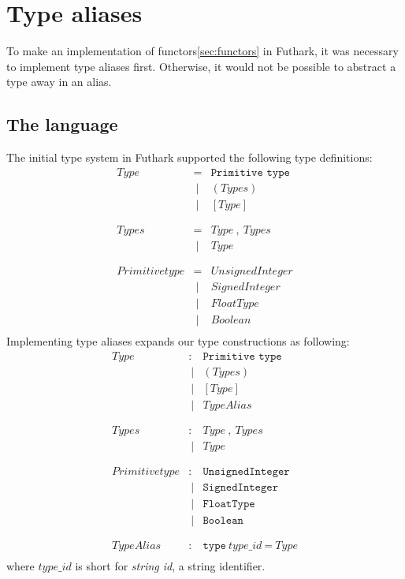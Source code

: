\section{Type aliases}
To make an implementation of functors\ref{sec:functors} in Futhark, it was necessary
to implement type aliases first. Otherwise, it would not be possible to abstract
a type away in an alias.
\subsection{The language}\label{futharks_types}
The initial type system in Futhark supported the following type definitions:
\begin{align*}
  Type           & = & \texttt{Primitive type} \\
                 &\ | & ( Types ) \\
                 &\ | & [ Type ] \\
  \\
  \\
  Types          & = & Type\ ,\ Types \\
                 &\ | & Type \\
  \\
  \\
  Primitive type & = & UnsignedInteger \\
                 &\ | & SignedInteger \\
                 &\ | & FloatType \\
                 &\ | & Boolean \\
\end{align*}
Implementing type aliases expands our type constructions as following:
\begin{align*}
  Type           & : & \texttt{Primitive type} \\
                 &\ | & ( Types ) \\
                 &\ | & [ Type ] \\
                 &\ | & TypeAlias \\
  \\
  \\
  Types          & : & Type\ ,\ Types \\
                 &\ | & Type \\
  \\
  \\
  Primitive type & : & \texttt{UnsignedInteger} \\
                 &\ | & \texttt{SignedInteger} \\
                 &\ | & \texttt{FloatType} \\
                 &\ | & \texttt{Boolean} \\
  \\
  \\
  TypeAlias      & :  & \texttt{type}\ type\_id\ \texttt{=}\ Type \\
\end{align*}
where $type\_id$ is short for \textit{string id}, a string identifier.

